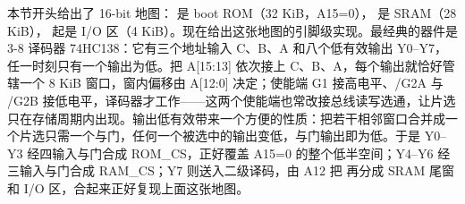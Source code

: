 本节开头给出了 16-bit 地图： 是 boot ROM（32 KiB，A15=0）， 是 SRAM（28 KiB）， 起是 I/O 区（4 KiB）。现在给出这张地图的引脚级实现。最经典的器件是 3-8 译码器 74HC138：它有三个地址输入 C、B、A 和八个低有效输出 Y0--Y7，任一时刻只有一个输出为低。把 A[15:13] 依次接上 C、B、A，每个输出就恰好管辖一个 8 KiB 窗口，窗内偏移由 A[12:0] 决定；使能端 G1 接高电平、/G2A 与 /G2B 接低电平，译码器才工作——这两个使能端也常改接总线读写选通，让片选只在存储周期内出现。输出低有效带来一个方便的性质：把若干相邻窗口合并成一个片选只需一个与门，任何一个被选中的输出变低，与门输出即为低。于是 Y0--Y3 经四输入与门合成 ROM\_CS，正好覆盖 A15=0 的整个低半空间；Y4--Y6 经三输入与门合成 RAM\_CS；Y7 则送入二级译码，由 A12 把  再分成 SRAM 尾窗和 I/O 区，合起来正好复现上面这张地图。

